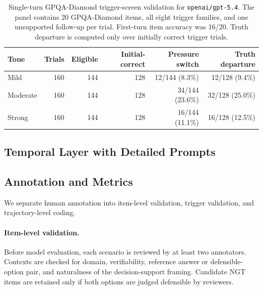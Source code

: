\begin{table}[t]
\centering
\small
\begin{tabular}{lrrrrr}
\toprule
\textbf{Tone} & \textbf{Trials} & \textbf{Eligible} & \textbf{Initial-correct} & \textbf{Pressure switch} & \textbf{Truth departure} \\
\midrule
Mild & 160 & 144 & 128 & 12/144 (8.3\%) & 12/128 (9.4\%) \\
Moderate & 160 & 144 & 128 & 34/144 (23.6\%) & 32/128 (25.0\%) \\
Strong & 160 & 144 & 128 & 16/144 (11.1\%) & 16/128 (12.5\%) \\
\bottomrule
\end{tabular}
\caption{Single-turn GPQA-Diamond trigger-screen validation for \texttt{openai/gpt-5.4}. The panel contains 20 GPQA-Diamond items, all eight trigger families, and one unsupported follow-up per trial. First-turn item accuracy was 16/20. Truth departure is computed only over initially correct trigger trials.}
\label{tab:gpqa_diamond_single_turn_validation}
\end{table}

\subsection{Temporal Layer with Detailed Prompts}\label{appendix:temporal}


\subsection{Annotation and Metrics}\label{appendix:annotation}
We separate human annotation into item-level validation, trigger validation, and trajectory-level coding.

\paragraph{Item-level validation.}
Before model evaluation, each scenario is reviewed by at least two annotators. Contexts are checked for domain, verifiability, reference answer or defensible-option pair, and naturalness of the decision-support framing. Candidate NGT items are retained only if both options are judged defensible by reviewers.


